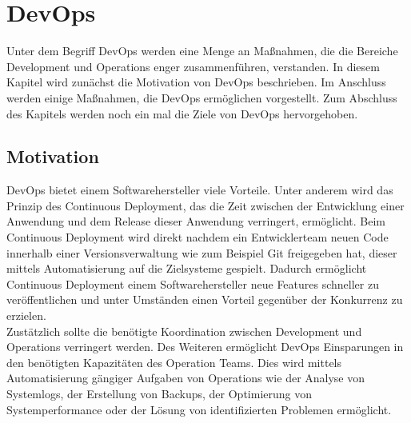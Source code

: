 \section{DevOps}
Unter dem Begriff DevOps werden eine Menge an Maßnahmen, die die Bereiche Development und Operations enger zusammenführen, verstanden. In diesem Kapitel wird zunächst die Motivation von DevOps beschrieben. Im Anschluss werden einige Maßnahmen, die DevOps ermöglichen vorgestellt. Zum Abschluss des Kapitels werden noch ein mal die Ziele von DevOps hervorgehoben.

\subsection{Motivation}
DevOps bietet einem Softwarehersteller viele Vorteile. Unter anderem wird das  Prinzip des Continuous Deployment, das die Zeit zwischen der Entwicklung einer Anwendung und dem Release dieser Anwendung verringert, ermöglicht. Beim Continuous Deployment wird direkt nachdem ein Entwicklerteam neuen Code innerhalb einer Versionsverwaltung wie zum Beispiel Git freigegeben hat, dieser mittels Automatisierung auf die Zielsysteme gespielt. Dadurch ermöglicht Continuous Deployment einem Softwarehersteller neue Features schneller zu veröffentlichen und unter Umständen einen Vorteil gegenüber der Konkurrenz zu erzielen.\\
Zustätzlich sollte die benötigte Koordination zwischen Development und Operations verringert werden. Des Weiteren ermöglicht DevOps Einsparungen in den benötigten Kapazitäten des Operation Teams. Dies wird mittels Automatisierung gängiger Aufgaben von Operations wie der Analyse von Systemlogs, der Erstellung von Backups, der Optimierung von Systemperformance oder der Lösung von identifizierten Problemen ermöglicht.

